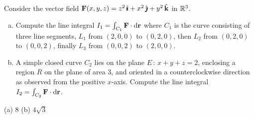 \begin{question}[M317 2016D] %
Consider the vector field $\mathbf{F}(x,y, z) = z^2 \,\hat{\pmb{\imath}} + x^2 \,\hat{\pmb{\jmath}} + y^2\,\hat{\mathbf{k}}$ 
in $\mathbb{R}^3$.
\begin{enumerate}[(a)]
\item
Compute the line integral $I_1 = \int_{C_1}\mathbf{F}\cdot\mathrm{d}\mathbf{r}$
where $C_1$ is the curve consisting of three line segments, 
$L_1$ from $(2, 0, 0)$ to $(0, 2, 0)$, then 
$L_2$ from $(0, 2, 0)$ to $(0, 0, 2)$, finally 
$L_3$ from $(0, 0, 2)$ to $(2, 0, 0)$.
\item
A simple closed curve $C_2$ lies on the plane $E\,:\, x + y + z = 2$, 
enclosing a region $R$ on the plane of area $3$, and oriented in a 
counterclockwise direction as observed from the positive $x$-axis. 
Compute the line integral $I_2 = \int_{C_2}\mathbf{F}\cdot\mathrm{d}\mathbf{r}$.

\end{enumerate}
\end{question}

%

\begin{answer} 
(a) $8$\qquad
(b) $4\sqrt{3}$
\end{answer}


